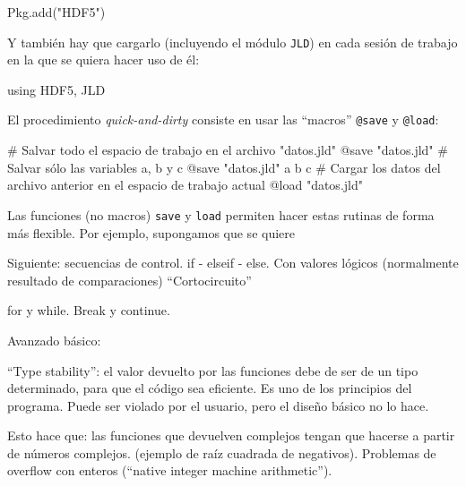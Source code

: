 ﻿\documentclass[spanish]{article}
\begin{document}
Pkg.add("HDF5")

Y también hay que cargarlo (incluyendo el módulo \texttt{JLD}) en cada
sesión de trabajo en la que se quiera hacer uso de él:

using HDF5, JLD

El procedimiento \emph{quick-and-dirty} consiste en usar las ``macros''
\texttt{@save} y \texttt{@load}:

# Salvar todo el espacio de trabajo en el archivo "datos.jld"
@save "datos.jld"
# Salvar sólo las variables a, b y c
@save "datos.jld" a b c
# Cargar los datos del archivo anterior en el espacio de trabajo actual
@load "datos.jld"

Las funciones (no macros) \texttt{save} y \texttt{load} permiten hacer
estas rutinas de forma más flexible. Por ejemplo, supongamos que se quiere 


Siguiente: secuencias de control.
if - elseif - else. Con valores lógicos (normalmente resultado de comparaciones)
``Cortocircuito''

for y while. Break y continue.


Avanzado básico:

``Type stability'': el valor devuelto por las funciones debe de ser de un
tipo determinado, para que el código sea eficiente. Es uno de los principios
del programa. Puede ser violado por el usuario, pero el diseño básico no lo hace.

Esto hace que: las funciones que devuelven complejos tengan que hacerse a partir
de números complejos. (ejemplo de raíz cuadrada de negativos).
Problemas de overflow con enteros (``native integer machine arithmetic'').

 
\end{document}
